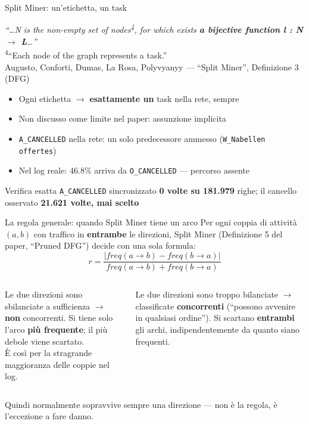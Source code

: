 \documentclass[11pt,aspectratio=169]{beamer}
\begin{document}
\begin{frame}{Split Miner: un'etichetta, un task}
\begin{tcolorbox}[colback=white,colframe=accent,boxrule=0.4pt,left=8pt]
\small\emph{``\ldots N is the non-empty set of nodes\textsuperscript{4}, for which exists \textbf{a bijective function l : N $\to$ L}\ldots''}\\
{\scriptsize\textsuperscript{4}``Each node of the graph represents a task.''}\\
\textcolor{inkfaint}{Augusto, Conforti, Dumas, La Rosa, Polyvyanyy --- ``Split Miner'', Definizione 3 (DFG)}
\end{tcolorbox}
\vspace{1em}
\begin{itemize}
\item Ogni etichetta $\to$ \textbf{esattamente un} task nella rete, sempre
\item Non discusso come limite nel paper: assunzione implicita
\item \texttt{A\_CANCELLED} nella rete: un solo predecessore ammesso (\texttt{W\_Nabellen offertes})
\item Nel log reale: 46.8\% arriva da \texttt{O\_CANCELLED} --- percorso assente
\end{itemize}
\begin{alertblock}{Verifica esatta}
\texttt{A\_CANCELLED} sincronizzato \textbf{0 volte su 181.979} righe; il cancello osservato \textbf{21.621 volte, mai scelto}
\end{alertblock}
\end{frame}

\begin{frame}{La regola generale: quando Split Miner tiene un arco}
Per ogni coppia di attivit\`a $(a,b)$ con traffico in \textbf{entrambe} le direzioni, Split Miner (Definizione 5 del paper, ``Pruned DFG'') decide con una sola formula:
\[
r = \frac{|freq(a{\to}b) - freq(b{\to}a)|}{freq(a{\to}b)+freq(b{\to}a)}
\]
\begin{columns}[T]
\begin{tcolorbox}[colback=accentsoft,colframe=accent,title=Caso normale: $r \geq \varepsilon$]
Le due direzioni sono sbilanciate a sufficienza $\to$ \textbf{non} concorrenti. Si tiene solo l'arco \textbf{pi\`u frequente}; il pi\`u debole viene scartato.\\
\small\`E cos\`i per la stragrande maggioranza delle coppie nel log.
\end{tcolorbox}
\begin{tcolorbox}[colback=warnsoft,colframe=warncol,title=Caso concorrenza: $r < \varepsilon$]
Le due direzioni sono troppo bilanciate $\to$ classificate \textbf{concorrenti} (``possono avvenire in qualsiasi ordine''). Si scartano \textbf{entrambi} gli archi, indipendentemente da quanto siano frequenti.
\end{tcolorbox}
\end{columns}
\vspace{0.6em}
{\small Quindi normalmente sopravvive sempre una direzione --- non \`e la regola, \`e l'eccezione a fare danno.}
\end{frame}
\end{document}
